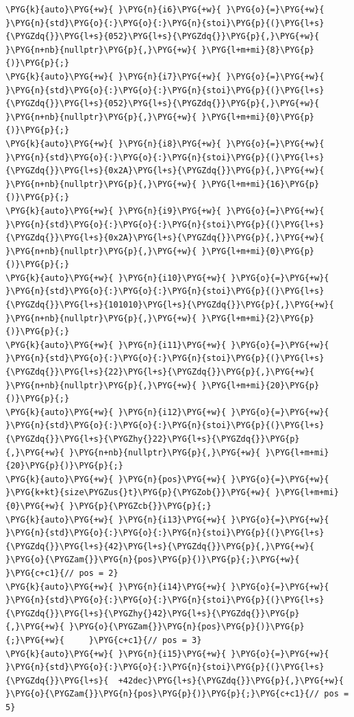 \begin{codeblockbg}
\begin{Verbatim}[commandchars=\\\{\},breaklines=true,breakanywhere=true,fontsize=\codefont,xleftmargin=17bp]
\PYG{k}{auto}\PYG{+w}{ }\PYG{n}{i6}\PYG{+w}{ }\PYG{o}{=}\PYG{+w}{ }\PYG{n}{std}\PYG{o}{:}\PYG{o}{:}\PYG{n}{stoi}\PYG{p}{(}\PYG{l+s}{\PYGZdq{}}\PYG{l+s}{052}\PYG{l+s}{\PYGZdq{}}\PYG{p}{,}\PYG{+w}{ }\PYG{n+nb}{nullptr}\PYG{p}{,}\PYG{+w}{ }\PYG{l+m+mi}{8}\PYG{p}{)}\PYG{p}{;}
\PYG{k}{auto}\PYG{+w}{ }\PYG{n}{i7}\PYG{+w}{ }\PYG{o}{=}\PYG{+w}{ }\PYG{n}{std}\PYG{o}{:}\PYG{o}{:}\PYG{n}{stoi}\PYG{p}{(}\PYG{l+s}{\PYGZdq{}}\PYG{l+s}{052}\PYG{l+s}{\PYGZdq{}}\PYG{p}{,}\PYG{+w}{ }\PYG{n+nb}{nullptr}\PYG{p}{,}\PYG{+w}{ }\PYG{l+m+mi}{0}\PYG{p}{)}\PYG{p}{;}
\PYG{k}{auto}\PYG{+w}{ }\PYG{n}{i8}\PYG{+w}{ }\PYG{o}{=}\PYG{+w}{ }\PYG{n}{std}\PYG{o}{:}\PYG{o}{:}\PYG{n}{stoi}\PYG{p}{(}\PYG{l+s}{\PYGZdq{}}\PYG{l+s}{0x2A}\PYG{l+s}{\PYGZdq{}}\PYG{p}{,}\PYG{+w}{ }\PYG{n+nb}{nullptr}\PYG{p}{,}\PYG{+w}{ }\PYG{l+m+mi}{16}\PYG{p}{)}\PYG{p}{;}
\PYG{k}{auto}\PYG{+w}{ }\PYG{n}{i9}\PYG{+w}{ }\PYG{o}{=}\PYG{+w}{ }\PYG{n}{std}\PYG{o}{:}\PYG{o}{:}\PYG{n}{stoi}\PYG{p}{(}\PYG{l+s}{\PYGZdq{}}\PYG{l+s}{0x2A}\PYG{l+s}{\PYGZdq{}}\PYG{p}{,}\PYG{+w}{ }\PYG{n+nb}{nullptr}\PYG{p}{,}\PYG{+w}{ }\PYG{l+m+mi}{0}\PYG{p}{)}\PYG{p}{;}
\PYG{k}{auto}\PYG{+w}{ }\PYG{n}{i10}\PYG{+w}{ }\PYG{o}{=}\PYG{+w}{ }\PYG{n}{std}\PYG{o}{:}\PYG{o}{:}\PYG{n}{stoi}\PYG{p}{(}\PYG{l+s}{\PYGZdq{}}\PYG{l+s}{101010}\PYG{l+s}{\PYGZdq{}}\PYG{p}{,}\PYG{+w}{ }\PYG{n+nb}{nullptr}\PYG{p}{,}\PYG{+w}{ }\PYG{l+m+mi}{2}\PYG{p}{)}\PYG{p}{;}
\PYG{k}{auto}\PYG{+w}{ }\PYG{n}{i11}\PYG{+w}{ }\PYG{o}{=}\PYG{+w}{ }\PYG{n}{std}\PYG{o}{:}\PYG{o}{:}\PYG{n}{stoi}\PYG{p}{(}\PYG{l+s}{\PYGZdq{}}\PYG{l+s}{22}\PYG{l+s}{\PYGZdq{}}\PYG{p}{,}\PYG{+w}{ }\PYG{n+nb}{nullptr}\PYG{p}{,}\PYG{+w}{ }\PYG{l+m+mi}{20}\PYG{p}{)}\PYG{p}{;}
\PYG{k}{auto}\PYG{+w}{ }\PYG{n}{i12}\PYG{+w}{ }\PYG{o}{=}\PYG{+w}{ }\PYG{n}{std}\PYG{o}{:}\PYG{o}{:}\PYG{n}{stoi}\PYG{p}{(}\PYG{l+s}{\PYGZdq{}}\PYG{l+s}{\PYGZhy{}22}\PYG{l+s}{\PYGZdq{}}\PYG{p}{,}\PYG{+w}{ }\PYG{n+nb}{nullptr}\PYG{p}{,}\PYG{+w}{ }\PYG{l+m+mi}{20}\PYG{p}{)}\PYG{p}{;}
\PYG{k}{auto}\PYG{+w}{ }\PYG{n}{pos}\PYG{+w}{ }\PYG{o}{=}\PYG{+w}{ }\PYG{k+kt}{size\PYGZus{}t}\PYG{p}{\PYGZob{}}\PYG{+w}{ }\PYG{l+m+mi}{0}\PYG{+w}{ }\PYG{p}{\PYGZcb{}}\PYG{p}{;}
\PYG{k}{auto}\PYG{+w}{ }\PYG{n}{i13}\PYG{+w}{ }\PYG{o}{=}\PYG{+w}{ }\PYG{n}{std}\PYG{o}{:}\PYG{o}{:}\PYG{n}{stoi}\PYG{p}{(}\PYG{l+s}{\PYGZdq{}}\PYG{l+s}{42}\PYG{l+s}{\PYGZdq{}}\PYG{p}{,}\PYG{+w}{ }\PYG{o}{\PYGZam{}}\PYG{n}{pos}\PYG{p}{)}\PYG{p}{;}\PYG{+w}{      }\PYG{c+c1}{// pos = 2}
\PYG{k}{auto}\PYG{+w}{ }\PYG{n}{i14}\PYG{+w}{ }\PYG{o}{=}\PYG{+w}{ }\PYG{n}{std}\PYG{o}{:}\PYG{o}{:}\PYG{n}{stoi}\PYG{p}{(}\PYG{l+s}{\PYGZdq{}}\PYG{l+s}{\PYGZhy{}42}\PYG{l+s}{\PYGZdq{}}\PYG{p}{,}\PYG{+w}{ }\PYG{o}{\PYGZam{}}\PYG{n}{pos}\PYG{p}{)}\PYG{p}{;}\PYG{+w}{     }\PYG{c+c1}{// pos = 3}
\PYG{k}{auto}\PYG{+w}{ }\PYG{n}{i15}\PYG{+w}{ }\PYG{o}{=}\PYG{+w}{ }\PYG{n}{std}\PYG{o}{:}\PYG{o}{:}\PYG{n}{stoi}\PYG{p}{(}\PYG{l+s}{\PYGZdq{}}\PYG{l+s}{  +42dec}\PYG{l+s}{\PYGZdq{}}\PYG{p}{,}\PYG{+w}{ }\PYG{o}{\PYGZam{}}\PYG{n}{pos}\PYG{p}{)}\PYG{p}{;}\PYG{c+c1}{// pos = 5}
\end{Verbatim}
\end{codeblockbg}


